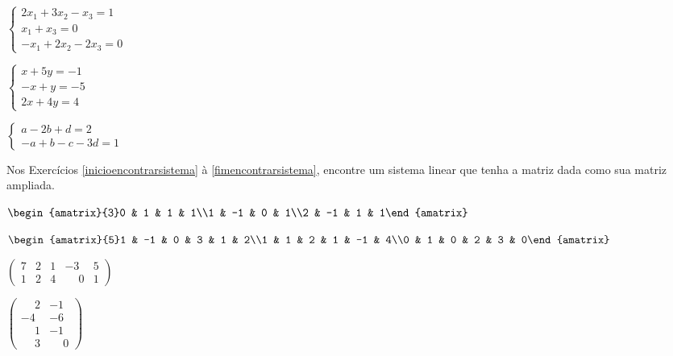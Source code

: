 \documentclass[12pt]{exam}
\begin{document}
\begin{exercicio}
    $\begin{cases}2x_1 + 3x_2 - x_3 = 1\\x_1 + x_3 = 0\\-x_1 + 2x_2 - 2x_3 = 0\end{cases}$
\end{exercicio}

\begin{exercicio}
    $\begin{cases}x + 5y = -1\\-x + y = -5\\2x + 4y = 4\end{cases}$
\end{exercicio}

\begin{exercicio}\label{fimmatrizampliada}
    $\begin{cases}a - 2b + d = 2\\-a + b - c - 3d = 1\end{cases}$
\end{exercicio}

Nos Exercícios \ref{inicioencontrarsistema} à \ref{fimencontrarsistema}, encontre um sistema linear que tenha a matriz dada como sua matriz ampliada.

\begin{exercicio}\label{inicioencontrarsistema}
    $\begin{amatrix}{3}0 & 1 & 1 & 1\\1 & -1 & 0 & 1\\2 & -1 & 1 & 1\end{amatrix}$
\end{exercicio}

\begin{exercicio}
    $\begin{amatrix}{5}1 & -1 & 0 & 3 & 1 & 2\\1 & 1 & 2 & 1 & -1 & 4\\0 & 1 & 0 & 2 & 3 & 0\end{amatrix}$
\end{exercicio}

\begin{exercicio}
    $\begin{pmatrix}7 & 2 & 1 & -3 & 5\\1 & 2 & 4 & \phantom{-} 0 & 1\end{pmatrix}$
\end{exercicio}

\begin{exercicio}
    $\begin{pmatrix}\phantom{-} 2 & -1 \\ -4 & -6\\ \phantom{-} 1 & -1\\\phantom{-} 3 & \phantom{-} 0\end{pmatrix}$
\end{exercicio}
\end{document}
